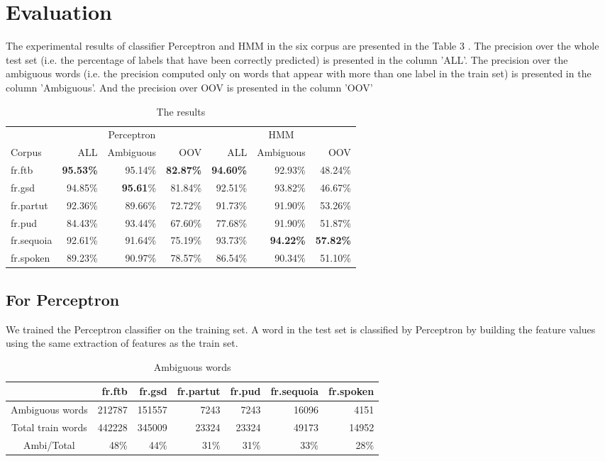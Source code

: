\documentclass{article}
\begin{document}
\section{Evaluation}
The experimental results of classifier Perceptron and HMM in the six corpus are presented in the Table 3 . The precision over the whole test set (i.e. the percentage of labels that have been correctly predicted) is presented in the column 'ALL'. The precision over the ambiguous words (i.e. the precision computed only on words that appear with more than one label in the train set) is presented in the column 'Ambiguous'. And the precision over OOV is presented in the column 'OOV'


\begin{table}[h]
\caption{The results}
\vspace{5pt}
\centering
    
\begin{tabular}{|l|rrr|rrr|}
\hline
\multicolumn{1}{|c|}{\ } & \multicolumn{3}{c|}{Perceptron} & \multicolumn{3}{c|}{HMM}\\ 
\cline{2-7}
Corpus & ALL & Ambiguous & OOV & ALL & Ambiguous & OOV\\
\hline
fr.ftb     & \textbf{95.53\%} & 95.14\% & \textbf{82.87\%} & \textbf{94.60\%} & 92.93\% & 48.24\% \\
fr.gsd     & 94.85\% & \textbf{95.61}\% & 81.84\% & 92.51\% & 93.82\% & 46.67\% \\
fr.partut  & 92.36\% & 89.66\% & 72.72\% & 91.73\% & 91.90\% & 53.26\% \\
fr.pud     & 84.43\% & 93.44\% & 67.60\% & 77.68\% & 91.90\% & 51.87\% \\
fr.sequoia & 92.61\% & 91.64\% & 75.19\% & 93.73\% & \textbf{94.22\%} & \textbf{57.82\%} \\
fr.spoken  & 89.23\% & 90.97\% & 78.57\% & 86.54\% & 90.34\% & 51.10\% \\
\hline
\end{tabular}
\end{table}


\subsection{For Perceptron}
We trained the Perceptron classifier on the training set. A word in the test set is classified by Perceptron by  building the feature values using the same extraction of features as the train set. 

\begin{table}[h]
\caption{Ambiguous words}
\vspace{5pt}
\centering
\begin{tabular}{|c|r|r|r|r|r|r|}
\hline
\ & fr.ftb & fr.gsd & fr.partut & fr.pud & fr.sequoia & fr.spoken \\
\hline
Ambiguous words & 212787 & 151557 & 7243 & 7243 & 16096 & 4151 \\
\hline
Total train words & 442228 & 345009 & 23324 & 23324 & 49173 & 14952 \\
\hline
Ambi/Total & 48\% & 44\% & 31\% & 31\% & 33\% & 28\%\\  
\hline
\end{tabular}
\end{table}
\end{document}
